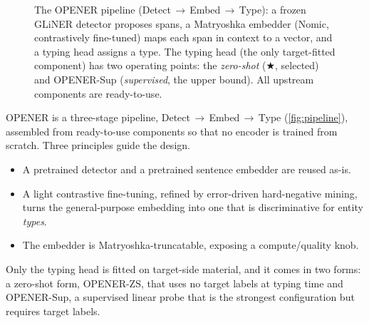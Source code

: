 \begin{figure}[tp]
{{{%
}%
}}
\caption{The OPENER pipeline (Detect\,$\rightarrow$\,Embed\,$\rightarrow$\,Type): a frozen GLiNER detector proposes spans, a Matryoshka embedder (Nomic, contrastively fine-tuned) maps each span in context to a vector, and a typing head assigns a type. The typing head (the only target-fitted component) has two operating points: the \emph{zero-shot} \zstr ($\bigstar$, selected) and OPENER-Sup (\emph{supervised}, the upper bound). All upstream components are ready-to-use.}
\label{fig:pipeline}
\end{figure}

OPENER is a three-stage pipeline, Detect\,$\rightarrow$\,Embed\,$\rightarrow$\,Type (\autoref{fig:pipeline}), assembled from ready-to-use components so that no encoder is trained from scratch.
Three principles guide the design.
\begin{itemize}
\item A pretrained detector and a pretrained sentence embedder are reused as-is.
\item A light contrastive fine-tuning, refined by error-driven hard-negative mining, turns the general-purpose embedding into one that is discriminative for entity \emph{types}.
\item The embedder is Matryoshka-truncatable, exposing a compute/quality knob.
\end{itemize}
Only the typing head is fitted on target-side material, and it comes in two forms: a zero-shot form, OPENER-ZS, that uses no target labels at typing time and OPENER-Sup, a supervised linear probe that is the strongest configuration but requires target labels.

